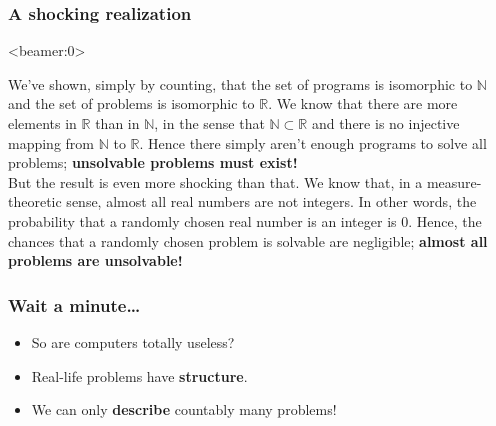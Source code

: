\documentclass[handout, 12pt]{beamer}
\newcommand{\N}{\mathbb{N}}
\newcommand{\R}{\mathbb{R}}
\begin{document}
\begin{frame}

\frametitle{A shocking realization}

\begin{block}{}
\centering
\color{r}{\LARGE Almost all problems are unsolvable!}
\end{block}

\pause

\begin{block}{}
\centering
{}
\end{block}

\end{frame}

\begin{frame}<beamer:0>

\footnotesize
We've shown, simply by counting, that the set of programs is isomorphic to $\N$ and the set of problems is isomorphic to $\R$. We know that there are more elements in $\R$ than in $\N$, in the sense that $\N\subset\R$ and there is no injective mapping from $\N$ to $\R$. Hence there simply aren't enough programs to solve all problems; \textbf{unsolvable problems must exist!}
\\[0.6em]
But the result is even more shocking than that. We know that, in a measure-theoretic sense, almost all real numbers are not integers. In other words, the probability that a randomly chosen real number is an integer is $0$. Hence, the chances that a randomly chosen problem is solvable are negligible; \textbf{almost all problems are unsolvable!}

\end{frame}

\begin{frame}

\frametitle{Wait a minute\ldots}

\begin{itemize}
\addtolength{\itemsep}{0.5\baselineskip}
\pause\item So are computers totally useless?
\pause\item Real-life problems have \textbf{structure}.
\pause\item We can only \textbf{describe} countably many problems!
\end{itemize}

\end{frame}
\end{document}
